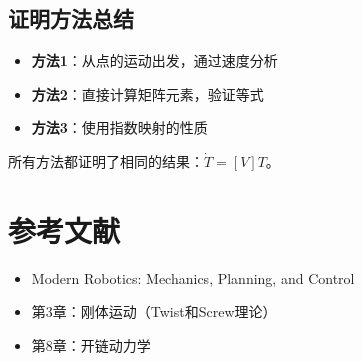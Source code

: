 \documentclass[12pt,a4paper]{article}
\begin{document}
\subsection{证明方法总结}

\begin{itemize}
\item \textbf{方法1}：从点的运动出发，通过速度分析
\item \textbf{方法2}：直接计算矩阵元素，验证等式
\item \textbf{方法3}：使用指数映射的性质
\end{itemize}

所有方法都证明了相同的结果：$\dot{T} = [V]T$。

\section{参考文献}

\begin{itemize}
\item Modern Robotics: Mechanics, Planning, and Control
\item 第3章：刚体运动（Twist和Screw理论）
\item 第8章：开链动力学
\end{itemize}
\end{document}
